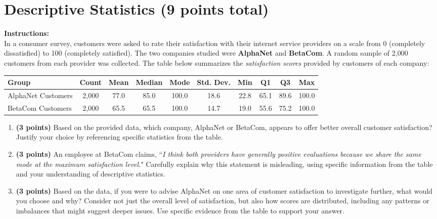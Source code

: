 \documentclass{article}
\newcommand{\blankbox}[2][3cm]{%
    \vspace{-0.5em}
    \begin{figure}[H]
        \makebox[\linewidth]{%
            \begin{tcolorbox}[
                colback=white, 
                colframe=white,  %
                width=#2, %
                height=#1,
                boxrule=0.2mm
            ]
            \end{tcolorbox}
        }
    \end{figure}
    \vspace{-2em}
}
\begin{document}
\newpage

\section{Descriptive Statistics (9 points total)} 
\noindent\textbf{Instructions:} \\
In a consumer survey, customers were asked to rate their satisfaction with their internet service providers on a scale from 0 (completely dissatisfied) to 100 (completely satisfied). The two companies studied were \textbf{AlphaNet} and \textbf{BetaCom}. A random sample of 2,000 customers from each provider was collected. The table below summarizes the \emph{satisfaction scores} provided by customers of each company:

\begin{center}
\begin{tabular}{|p{3.5cm}|c|c|c|c|c|c|c|c|c|}
\hline
\textbf{Group} & \textbf{Count} & \textbf{Mean} & \textbf{Median} & \textbf{Mode} & \textbf{Std. Dev.} & \textbf{Min} & \textbf{Q1} & \textbf{Q3} & \textbf{Max} \\
\hline
AlphaNet Customers & 2,000 & 77.0 & 85.0 & 100.0 & 18.6 & 22.8 & 65.1 & 89.6 & 100.0 \\
BetaCom Customers & 2,000 & 65.5 & 65.5 & 100.0 & 14.7 & 19.0 & 55.6 & 75.2 & 100.0 \\
\hline
\end{tabular}
\end{center}

\begin{enumerate}
\item \textbf{(3 points)} Based on the provided data, which company, AlphaNet or BetaCom, appears to offer better overall customer satisfaction? Justify your choice by referencing specific statistics from the table. \blankbox[5cm]{1.0\linewidth}

\item \textbf{(3 points)}  An employee at BetaCom claims, ``\emph{I think both providers have generally positive evaluations because we share the same mode at the maximum satisfaction level.}" Carefully explain why this statement is misleading, using specific information from the table and your understanding of descriptive statistics. \blankbox[6cm]{1.0\linewidth}

\item \textbf{(3 points)}  Based on the data, if you were to advise AlphaNet on one area of customer satisfaction to investigate further, what would you choose and why? Consider not just the overall level of satisfaction, but also how scores are distributed, including any patterns or imbalances that might suggest deeper issues. Use specific evidence from the table to support your answer. \blankbox[6cm]{1.0\linewidth}
\end{enumerate}
\end{document}
